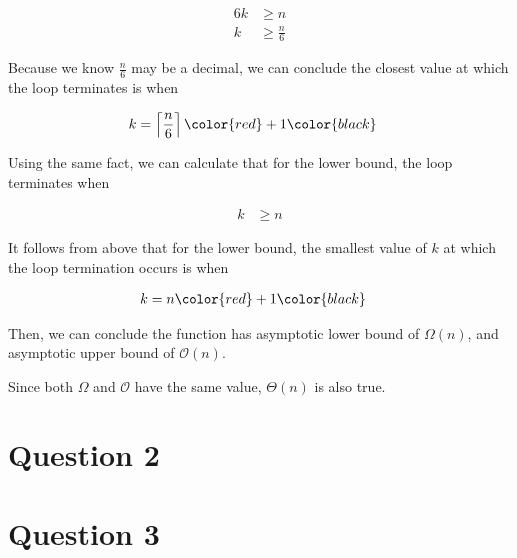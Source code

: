 \documentclass[12pt]{article}
\begin{document}
\begin{enumerate}[a.]
\begin{mdframed}
        \begin{align}
            6k &\geq n\\
            k &\geq \frac{n}{6}
        \end{align}

        Because we know $\frac{n}{6}$ may be a decimal, we can conclude the closest value at
        which the loop terminates is when

        \begin{align}
            k &= \left\lceil \frac{n}{6} \right\rceil \color{red}+1\color{black}
        \end{align}

        \bigskip

        Using the same fact, we can calculate that for the lower bound, the loop
        terminates when

        \begin{align}
            k &\geq n
        \end{align}

        It follows from above that for the lower bound, the smallest value of $k$ at which
        the loop termination occurs is when

        \begin{align}
            k &= n \color{red}+1\color{black}
        \end{align}

        \bigskip

        Then, we can conclude the function has asymptotic lower bound of $\Omega(n)$, and
        asymptotic upper bound of $\mathcal{O}(n)$.

        \bigskip

        Since both $\Omega$ and $\mathcal{O}$ have the same value, $\Theta(n)$
        is also true.

    \end{mdframed}

\end{enumerate}

\section*{Question 2}

\section*{Question 3}
\end{document}
